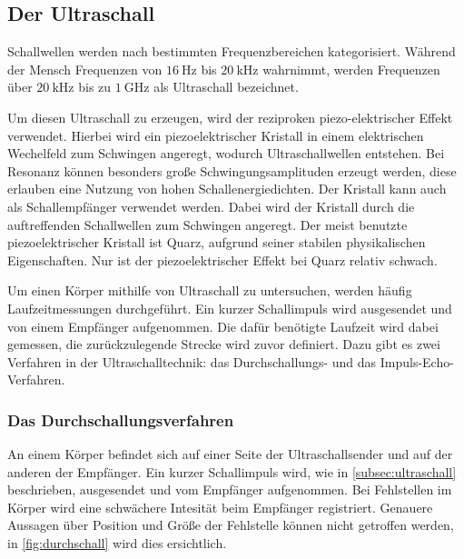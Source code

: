 \subsection{Der Ultraschall}
\label{subsec:ultraschall}

Schallwellen werden nach bestimmten Frequenzbereichen kategorisiert.
Während der Mensch Frequenzen von $\SI{16}{\hertz}$ bis $\SI{20}{\kilo\hertz}$ wahrnimmt, 
werden Frequenzen über $\SI{20}{\kilo\hertz}$ bis zu $\SI{1}{\giga\hertz}$ als Ultraschall bezeichnet.

\noindent
Um diesen Ultraschall zu erzeugen, wird der reziproken piezo-elektrischer Effekt verwendet.
Hierbei wird ein piezoelektrischer Kristall in einem elektrischen Wechelfeld zum Schwingen angeregt, wodurch Ultraschallwellen entstehen.
Bei Resonanz können besonders große Schwingungsamplituden erzeugt werden, diese erlauben eine Nutzung von hohen Schallenergiedichten.
Der Kristall kann auch als Schallempfänger verwendet werden. Dabei wird der Kristall durch die auftreffenden Schallwellen zum Schwingen angeregt.
Der meist benutzte piezoelektrischer Kristall ist Quarz, aufgrund seiner stabilen physikalischen Eigenschaften.
Nur ist der piezoelektrischer Effekt bei Quarz relativ schwach.

\noindent
Um einen Körper mithilfe von Ultraschall zu untersuchen, werden häufig Laufzeitmessungen durchgeführt.
Ein kurzer Schallimpuls wird ausgesendet und von einem Empfänger aufgenommen.
Die dafür benötigte Laufzeit wird dabei gemessen,  die zurückzulegende Strecke wird zuvor definiert.
Dazu gibt es zwei Verfahren in der Ultraschalltechnik: das Durchschallungs- und das Impuls-Echo-Verfahren.

\subsubsection{Das Durchschallungsverfahren}
\label{subsubsec:durchschall}
An einem Körper befindet sich auf einer Seite der Ultraschallsender und auf der anderen der Empfänger.
Ein kurzer Schallimpuls wird, wie in \autoref{subsec:ultraschall} beschrieben, ausgesendet und vom Empfänger aufgenommen.
Bei Fehlstellen im Körper wird eine schwächere Intesität beim Empfänger registriert.
Genauere Aussagen über Position und Größe der Fehlstelle können nicht getroffen werden, in \autoref{fig:durchschall} wird dies ersichtlich.


